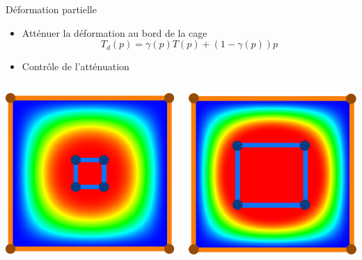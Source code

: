 \documentclass[xcolor=x11names,compress]{beamer}
\renewcommand{\(}{\begin{columns}} \renewcommand{\)}{\end{columns}}
\newcommand{\<}[1]{\begin{column}{#1}} \renewcommand{\>}{\end{column}}
\begin{document}
\begin{frame}{Déformation partielle}
  \begin{itemize}
    \item Atténuer la déformation au bord de la cage
    \begin{displaymath}
      T_{d}(p) = \gamma(p) T(p) + (1-\gamma(p)) p
    \end{displaymath}
    \item Contrôle de l'atténuation
  \end{itemize}
  \begin{columns}[t]
    \begin{column}{0.3\textwidth}
      \includegraphics[scale=0.15]{BoundaryWeightFunction-Petite}
    \end{column}
    \begin{column}{0.3\textwidth}
      \includegraphics[scale=0.15]{BoundaryWeightFunction}

\end{column}
\end{columns}
\end{frame}
\end{document}
